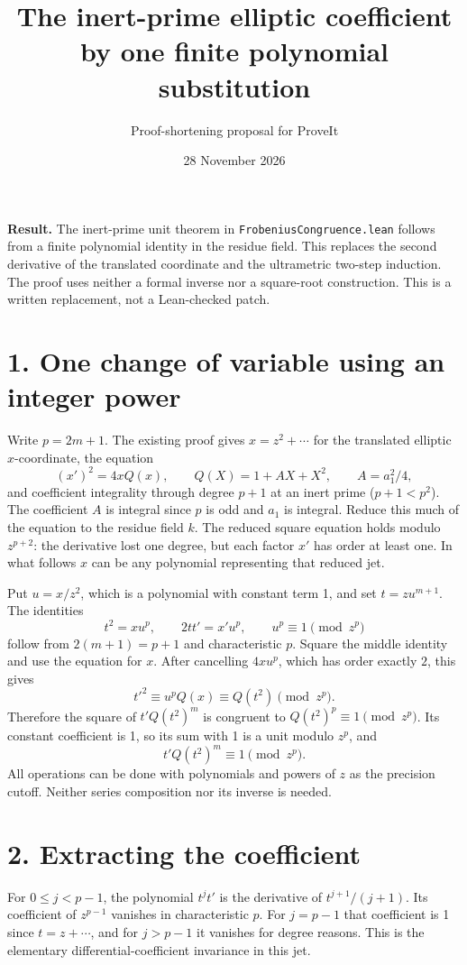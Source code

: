 \documentclass[11pt]{article}
\title{The inert-prime elliptic coefficient\\ by one finite polynomial substitution}
\author{Proof-shortening proposal for ProveIt}
\date{28 November 2026}
\begin{document}
\maketitle
\noindent\textbf{Result.}
The inert-prime unit theorem in \texttt{FrobeniusCongruence.lean}
follows from a finite polynomial identity in the residue field. This
replaces the second derivative of the translated coordinate and the
ultrametric two-step induction. The proof uses neither a formal inverse
nor a square-root construction. This is a written replacement, not a
Lean-checked patch.

\section*{1. One change of variable using an integer power}
Write \(p=2m+1\). The existing proof gives \(x=z^2+\cdots\) for the
translated elliptic \(x\)-coordinate, the equation
\[
 (x')^2=4xQ(x),\qquad Q(X)=1+AX+X^2,\qquad A=a_1^2/4,
\]
and coefficient integrality through degree \(p+1\) at an inert prime
(\(p+1<p^2\)). The coefficient \(A\) is integral since \(p\) is odd and
\(a_1\) is integral. Reduce this much of the equation to the residue
field \(k\). The reduced square equation holds modulo \(z^{p+2}\):
the derivative lost one degree, but each factor \(x'\) has order at
least one. In what follows \(x\) can be any polynomial representing that
reduced jet.

Put \(u=x/z^2\), which is a polynomial with constant term 1, and set
\(t=zu^{m+1}\). The identities
\[
 t^2=xu^p,\qquad 2tt'=x'u^p,\qquad u^p\equiv1\pmod{z^p}
\]
follow from \(2(m+1)=p+1\) and characteristic \(p\).
Square the middle identity and use the equation for \(x\). After
cancelling \(4xu^p\), which has order exactly \(2\), this gives
\[
 t'^2\equiv u^p Q(x)\equiv Q(t^2)\pmod{z^p}.
\]
Therefore the square of \(t'Q(t^2)^m\) is congruent to
\(Q(t^2)^p\equiv1\pmod{z^p}\). Its constant coefficient is 1, so its
sum with 1 is a unit modulo \(z^p\), and
\[
 t'Q(t^2)^m\equiv1\pmod{z^p}.
\]
All operations can be done with polynomials and powers of \(z\) as the
precision cutoff. Neither series composition nor its inverse is needed.

\section*{2. Extracting the coefficient}
For \(0\le j<p-1\), the polynomial \(t^jt'\) is the derivative of
\(t^{j+1}/(j+1)\). Its coefficient of \(z^{p-1}\) vanishes in
characteristic \(p\). For \(j=p-1\) that coefficient is 1 since
\(t=z+\cdots\), and for \(j>p-1\) it vanishes for degree reasons.
This is the elementary differential-coefficient invariance in this jet.
\end{document}
